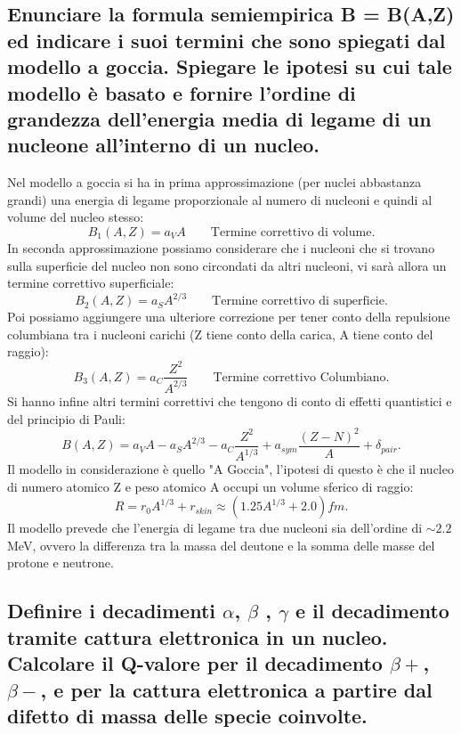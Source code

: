 \subsection[$\ $ Formula semiempirica B e termini spiegati dal modello a goccia]{Enunciare la formula semiempirica B = B(A,Z) ed indicare i suoi termini che sono spiegati dal modello a goccia. Spiegare le ipotesi su cui tale modello è basato e
fornire l'ordine di grandezza dell’energia media di legame di un nucleone all’interno di un nucleo.}
Nel modello a goccia si ha in prima approssimazione (per nuclei abbastanza grandi) una energia di legame proporzionale al numero di nucleoni e quindi al volume del nucleo stesso:
\[
	B_1\left( A, Z \right) = a_V A \quad \quad \text{Termine correttivo di volume}
.\] 
In seconda approssimazione possiamo considerare che i nucleoni che si trovano sulla superficie del nucleo non sono circondati da altri nucleoni, vi sarà allora un termine correttivo superficiale:
\[
	B_2\left( A,Z \right) = a_S A^{2/3} \quad \quad \text{Termine correttivo di superficie} 
.\] 
Poi possiamo aggiungere una ulteriore correzione per tener conto della repulsione columbiana tra i nucleoni carichi (Z tiene conto della carica, A tiene conto del raggio):
\[
	B_3\left( A,Z \right) = a_C \frac{Z^2}{A^{2/3}} \quad \quad \text{Termine correttivo Columbiano}
.\] 
Si hanno infine altri termini correttivi che tengono di conto di effetti quantistici e del principio di Pauli:
\[
	B\left( A,Z \right) = a_{V}A - a_{S}A^{2/3} - a_{C} \frac{Z^2 }{A^{1/3}} + a_{sym}\frac{\left( Z - N \right)^2}{A} + \delta_{pair} 
.\] \label{eq:B-energy}
Il modello in considerazione è quello "A Goccia", l'ipotesi di questo è che il nucleo di numero atomico Z e peso atomico A occupi un volume sferico di raggio:
\[
	R = r_0 A^{1/3} + r_{skin} \approx \left( 1.25 A^{1/3} + 2.0  \right) fm
.\]
Il modello prevede che l'energia di legame tra due nucleoni sia dell'ordine di $\sim 2.2$ MeV, ovvero la differenza tra la massa del deutone e la somma delle masse del protone e neutrone. 

\subsection[$\ $ Definizione dei decadimenti $\alpha$, $\beta^{+}$,$\beta^{-}$, $\gamma$, cattura elettronica con rispettivi Q-Value]{Definire i decadimenti $\alpha$, $\beta$ , $\gamma$ e il decadimento tramite cattura elettronica in un nucleo. Calcolare il Q-valore per il decadimento $\beta+$, $\beta-$, e per la cattura elettronica a partire dal difetto di massa delle specie coinvolte.} \label{sec:decadimenti}
